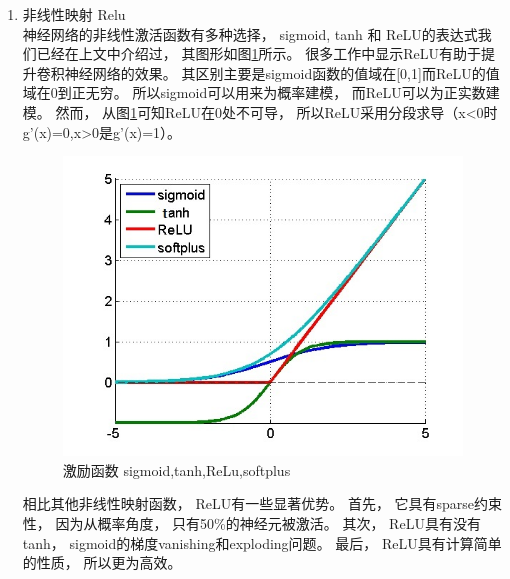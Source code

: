 \begin{enumerate}
	

	\item 非线性映射 Relu\\
	神经网络的非线性激活函数有多种选择， sigmoid, tanh 和 ReLU的表达式我们已经在上文中介绍过， 其图形如图\ref{Fig:activation}所示。 很多工作中显示ReLU有助于提升卷积神经网络的效果\cite{glorot2011deep,maas2013rectifier}。 其区别主要是sigmoid函数的值域在[0,1]而ReLU的值域在0到正无穷。 所以sigmoid可以用来为概率建模， 而ReLU可以为正实数建模。 然而， 从图\ref{Fig:activation}可知ReLU在0处不可导， 所以ReLU采用分段求导（x<0时g'(x)=0,x>0是g'(x)=1）。
	
	\begin{figure}[htb]
  	\centering
  	\includegraphics[scale=0.8]{Pictures/CNN/activation.jpg}
  	\caption{激励函数 sigmoid,tanh,ReLu,softplus}\label{Fig:activation}
	\end{figure}
	
	相比其他非线性映射函数， ReLU有一些显著优势。 首先， 它具有sparse约束性， 因为从概率角度， 只有50\%的神经元被激活。 其次， ReLU具有没有tanh， sigmoid的梯度vanishing和exploding问题\cite{zeiler2013rectified}。 最后， ReLU具有计算简单的性质， 所以更为高效。
	
\end{enumerate}




